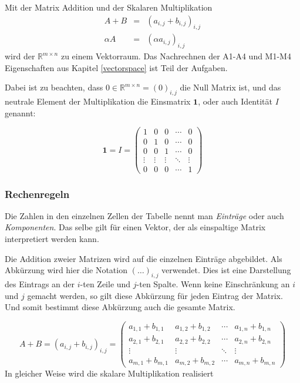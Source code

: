 Mit der Matrix Addition und der Skalaren Multiplikation
\begin{eqnarray*}
A+B &=& (a_{i,j} + b_{i,j})_{i,j} \\
\alpha A &=& (\alpha a_{i,j})_{i,j}
\end{eqnarray*}
wird der $\mathbb{R}^{m\times n}$ zu einem Vektorraum. Das Nachrechnen der A1-A4 und M1-M4 Eigenschaften aus Kapitel \ref{vectorspace} ist Teil der Aufgaben.

Dabei ist zu beachten, dass $0 \in \mathbb{R}^{m\times n} = (0)_{i,j}$ die Null Matrix ist, und das neutrale Element der Multiplikation die Einsmatrix $\mathbf{1}$, oder auch Identität $I$ genannt:

\begin{equation}\label{matrixid}
\mathbf{1} = I =
\begin{pmatrix}
1 & 0 & 0 & \cdots & 0 \\
0 & 1 & 0 & \cdots & 0 \\
0 & 0 & 1 & \cdots & 0 \\
\vdots & \vdots & \vdots & \ddots & \vdots \\
0 & 0 & 0 & \cdots & 1
\end{pmatrix}
\end{equation}

\subsubsection{Rechenregeln}

\begin{definition}
Die Zahlen in den einzelnen Zellen der Tabelle nennt man \textsl{Einträge} oder auch \textsl{Komponenten}. Das selbe gilt für einen Vektor, der als einspaltige Matrix interpretiert werden kann.
\end{definition}

Die Addition zweier Matrizen wird auf die einzelnen Einträge abgebildet. Als Abkürzung wird hier die Notation $(\dots)_{i,j}$ verwendet. Dies ist eine Darstellung des Eintrags an der $i$-ten Zeile und $j$-ten Spalte. Wenn keine Einschränkung an $i$ und $j$ gemacht werden, so gilt diese Abkürzung für jeden Eintrag der Matrix. Und somit bestimmt diese Abkürzung auch die gesamte Matrix.

\begin{equation*}
A + B = \left( a_{i,j} + b_{i,j} \right)_{i,j} = \begin{pmatrix}
a_{1,1}+b_{1,1} & a_{1,2}+b_{1,2} & \cdots & a_{1,n}+b_{1,n} \\
a_{2,1}+b_{2,1} & a_{2,2}+b_{2,2} & \cdots & a_{2,n}+b_{2,n} \\
\vdots & \vdots & \ddots & \vdots \\
a_{m,1}+b_{m,1} & a_{m,2}+b_{m,2} & \cdots & a_{m,n}+b_{m,n}
\end{pmatrix}
\end{equation*}
In gleicher Weise wird die skalare Multiplikation realisiert

